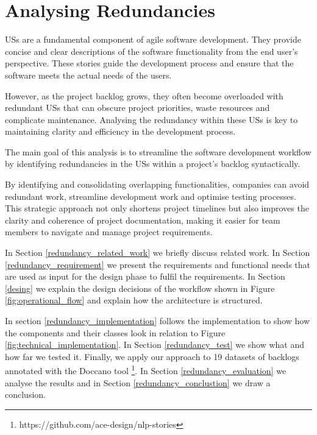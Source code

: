 \section{Analysing Redundancies}\label{redundancy}
USs are a fundamental component of agile software development. They provide concise and clear descriptions of the software functionality from the end user's perspective. These stories guide the development process and ensure that the software meets the actual needs of the users. 

However, as the project backlog grows, they often become overloaded with redundant USs that can obscure project priorities, waste resources and complicate maintenance. Analysing the redundancy within these USs is key to maintaining clarity and efficiency in the development process.

The main goal of this analysis is to streamline the software development workflow by identifying redundancies in the USs within a project's backlog syntactically.

 By identifying and consolidating overlapping functionalities, companies can avoid redundant work, streamline development work and optimise testing processes. This strategic approach not only shortens project timelines but also improves the clarity and coherence of project documentation, making it easier for team members to navigate and manage project requirements.

In Section \ref{redundancy_related_work} we briefly discuss related work. In Section \ref{redundancy_requirement} we present the requirements and functional needs that are used as input for the design phase to fulfil the requirements. In Section \ref{desing} we explain the design decisions of the workflow shown in Figure \ref{fig:operational_flow} and explain how the architecture is structured. 

In section \ref{redundancy_implementation} follows the implementation to show how the components and their classes look in relation to Figure \ref{fig:technical_implementation}. In Section \ref{redundancy_test} we show what and how far we tested it. Finally, we apply our approach to 19 datasets of backlogs annotated with the Doccano tool \footnote {https://github.com/ace-design/nlp-stories}. In Section \ref{redundancy_evaluation} we analyse the results and in Section \ref{redundancy_conclustion} we draw a conclusion. 
